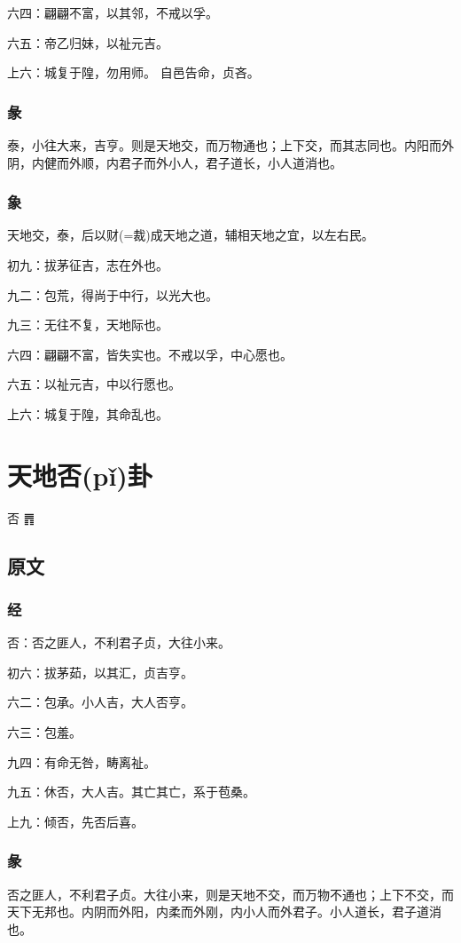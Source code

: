 \documentclass[12pt,oneside]{book}
\begin{document}
六四：翩翩不富，以其邻，不戒以孚。

六五：帝乙归妹，以祉元吉。

上六：城复于隍，勿用师。 自邑告命，贞吝。

\subsection{彖}
泰，小往大来，吉亨。则是天地交，而万物通也；上下交，而其志同也。内阳而外阴，内健而外顺，内君子而外小人，君子道长，小人道消也。

\subsection{象}
天地交，泰，后以财(=裁)成天地之道，辅相天地之宜，以左右民。

初九：拔茅征吉，志在外也。

九二：包荒，得尚于中行，以光大也。

九三：无往不复，天地际也。

六四：翩翩不富，皆失实也。不戒以孚，中心愿也。

六五：以祉元吉，中以行愿也。

上六：城复于隍，其命乱也。


\chapter{天地否(pǐ)卦}
否 {\Large ䷋}

\section{原文}

\subsection{经}
否：否之匪人，不利君子贞，大往小来。

初六：拔茅茹，以其汇，贞吉亨。

六二：包承。小人吉，大人否亨。

六三：包羞。

九四：有命无咎，畴离祉。

九五：休否，大人吉。其亡其亡，系于苞桑。

上九：倾否，先否后喜。

\subsection{彖}
否之匪人，不利君子贞。大往小来，则是天地不交，而万物不通也；上下不交，而天下无邦也。内阴而外阳，内柔而外刚，内小人而外君子。小人道长，君子道消也。
\end{document}
